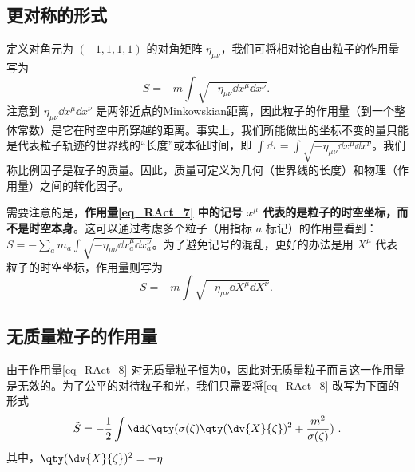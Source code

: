 \subsection{更对称的形式}
定义对角元为 $(-1,1,1,1)$ 的对角矩阵 $\eta_{\mu\nu}$，我们可将相对论自由粒子的作用量写为
\begin{equation}\label{eq_RAct_7}
S=-m\int \sqrt{-\eta_{\mu\nu}\dd x^\mu\dd x^\nu}.~
\end{equation}
注意到 $\eta_{\mu\nu}\dd x^\mu\dd x^\nu$ 是两邻近点的Minkowskian距离，因此粒子的作用量（到一个整体常数）是它在时空中所穿越的距离。事实上，我们所能做出的坐标不变的量只能是代表粒子轨迹的世界线的“长度”或本征时间，即 $\int\dd \tau=\int \sqrt{-\eta_{\mu\nu}\dd x^\mu\dd x^\nu}$。我们称比例因子是粒子的质量。因此，质量可定义为几何（世界线的长度）和物理（作用量）之间的转化因子。

需要注意的是，\textbf{作用量\autoref{eq_RAct_7} 中的记号 $x^\mu$ 代表的是粒子的时空坐标，而不是时空本身}。这可以通过考虑多个粒子（用指标 $a$ 标记）的作用量看到： $S=-\sum_a m_a\int \sqrt{-\eta_{\mu\nu}\dd x_a^\mu\dd x_a^\nu}$。为了避免记号的混乱，更好的办法是用 $X^\mu$ 代表粒子的时空坐标，作用量则写为
\begin{equation}\label{eq_RAct_8}
S=-m\int \sqrt{-\eta_{\mu\nu}\dd X^\mu\dd X^\nu}.~
\end{equation}


\subsection{无质量粒子的作用量}
由于作用量\autoref{eq_RAct_8} 对无质量粒子恒为0，因此对无质量粒子而言这一作用量是无效的。为了公平的对待粒子和光，我们只需要将\autoref{eq_RAct_8} 改写为下面的形式
\begin{equation}
\tilde S=-\frac{1}{2}\int\dd\zeta\qty(\sigma(\zeta)\qty(\dv{X}{\zeta})^2+\frac{m^2}{\sigma(\zeta)})~.
\end{equation}
其中，$\qty(\dv{X}{\zeta})^2=-\eta$

